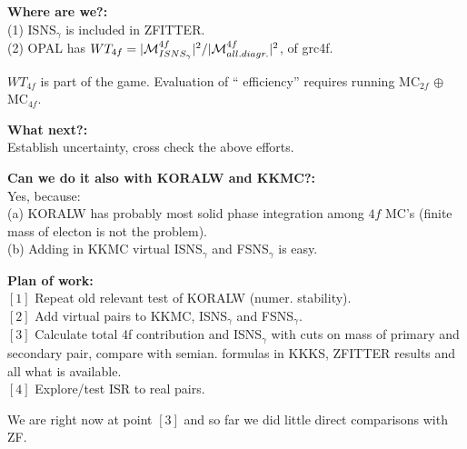\documentclass[dvips,portrait]{seminar}             %
\begin{document}
\begin{slide*}                                                %

{\bf Where are we?:}\\
(1) ISNS$_{\gamma}$ is included in ZFITTER.\\
(2) OPAL has
{\small $WT_{4f}=|{\cal M}^{4f}_{ISNS_{\gamma}}|^2 / |{\cal M}^{4f}_{all.diagr.}|^2$}, of grc4f.

{\scriptsize $WT_{4f}$ is part of the game.
Evaluation of ``{ efficiency}'' requires running
 MC$_{2f}$ $\oplus$  MC$_{4f}$.}

{\bf What next?:\\}
{ Establish uncertainty, cross check the above efforts.}

{\bf Can we do it also with KORALW and KKMC?:}\\
Yes, because:\\
(a) KORALW has probably most solid phase integration
among $4f$ MC's (finite mass of electon is not the problem).\\
(b) Adding in KKMC virtual ISNS$_{\gamma}$ and FSNS$_{\gamma}$ is easy.

{\bf Plan of work:}\\
$[1]$ Repeat old relevant test of KORALW (numer. stability).\\
$[2]$ Add virtual pairs to KKMC, ISNS$_{\gamma}$ and FSNS$_{\gamma}$.\\
$[3]$ Calculate total 4f contribution and ISNS$_{\gamma}$ with cuts on mass of primary
   and secondary pair, compare with semian. formulas in KKKS, 
   ZFITTER results and all what is available.\\
$[4]$ Explore/test ISR to real pairs.

We are right now at point $[3]$ and so far we did little direct
comparisons with ZF.

\vfill
\end{slide*}   %
\end{document}
